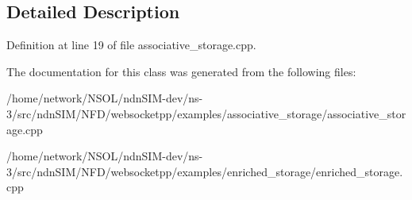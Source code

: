 

\subsection{Detailed Description}


Definition at line 19 of file associative\+\_\+storage.\+cpp.



The documentation for this class was generated from the following files\+:\begin{DoxyCompactItemize}
\item 
/home/network/\+N\+S\+O\+L/ndn\+S\+I\+M-\/dev/ns-\/3/src/ndn\+S\+I\+M/\+N\+F\+D/websocketpp/examples/associative\+\_\+storage/associative\+\_\+storage.\+cpp\item 
/home/network/\+N\+S\+O\+L/ndn\+S\+I\+M-\/dev/ns-\/3/src/ndn\+S\+I\+M/\+N\+F\+D/websocketpp/examples/enriched\+\_\+storage/enriched\+\_\+storage.\+cpp\end{DoxyCompactItemize}
